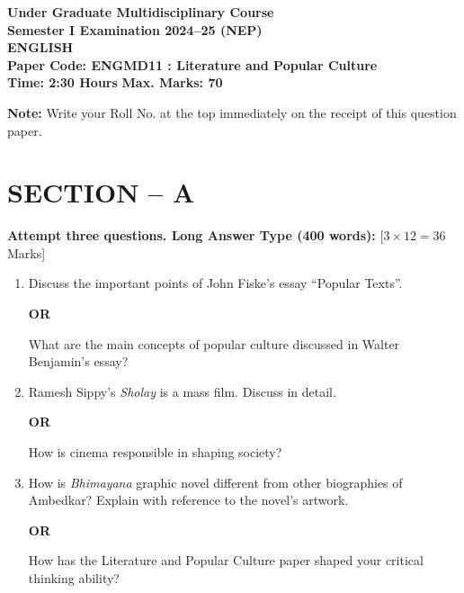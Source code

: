 \documentclass[11pt,a4paper]{article}
\begin{document}
\begin{center}
    {\Large   \textbf{Under Graduate Multidisciplinary Course}}\\[4pt]
    {\large   \textbf{Semester I Examination 2024--25 (NEP)}}\\[4pt]
    {\large   \textbf{ENGLISH}}\\[4pt]
   \textbf{Paper Code: ENGMD11 : Literature and Popular Culture}\\[6pt]
   \textbf{Time: 2:30 Hours} \hfill   \textbf{Max. Marks: 70}
\end{center}
\hr




\noindent   \textbf{Note:} Write your Roll No. at the top immediately on the receipt of this question paper.

\section*{SECTION -- A}



\noindent   \textbf{Attempt three questions. Long Answer Type (400 words):} \hfill [$3  \times 12 = 36$ Marks]


\begin{enumerate}[label=   \textbf{Q\arabic*.}]
    \item Discuss the important points of John Fiske's essay ``Popular Texts''.
    
\begin{center}   \textbf{OR}\end{center}
    What are the main concepts of popular culture discussed in Walter Benjamin's essay?

    \item Ramesh Sippy's   \textit{Sholay} is a mass film. Discuss in detail.
    
\begin{center}   \textbf{OR}\end{center}
    How is cinema responsible in shaping society?

    \item How is   \textit{Bhimayana} graphic novel different from other biographies of Ambedkar? Explain with reference to the novel's artwork.
    
\begin{center}   \textbf{OR}\end{center}
    How has the Literature and Popular Culture paper shaped your critical thinking ability?
\end{enumerate}
\end{document}
